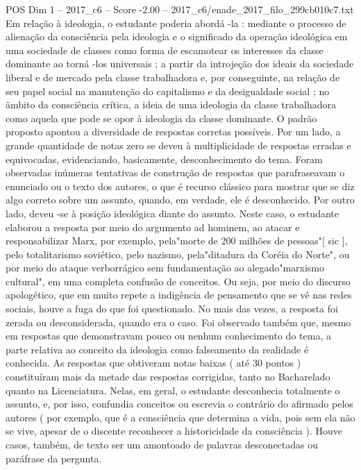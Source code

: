 \begin{textsample}{POS Dim 1 – 2017\_c6 – Score -2.00 – 2017\_c6/enade\_2017\_filo\_299cb010c7.txt}
Em relação à ideologia, o estudante poderia abordá -la : mediante o processo de alienação da consciência pela ideologia e o significado da operação ideológica em uma sociedade de classes como forma de escamotear os interesses da classe dominante ao torná -los universais ; a partir da introjeção dos ideais da sociedade liberal e de mercado pela classe trabalhadora e, por conseguinte, na relação de seu papel social na manutenção do capitalismo e da desigualdade social ; no âmbito da consciência crítica, a ideia de uma ideologia da classe trabalhadora como aquela que pode se opor à ideologia da classe dominante.
O padrão proposto apontou a diversidade de respostas corretas possíveis.
Por um lado, a grande quantidade de notas zero se deveu à multiplicidade de respostas erradas e equivocadas, evidenciando, basicamente, desconhecimento do tema.
Foram observadas inúmeras tentativas de construção de respostas que parafraseavam o enunciado ou o texto dos autores, o que é recurso clássico para mostrar que se diz algo correto sobre um assunto, quando, em verdade, ele é desconhecido.
Por outro lado, deveu -se à posição ideológica diante do assunto.
Neste caso, o estudante elaborou a resposta por meio do argumento ad hominem, ao atacar e responsabilizar Marx, por exemplo, pela"morte de 200 milhões de pessoas"[ sic ], pelo totalitarismo soviético, pelo nazismo, pela"ditadura da Coréia do Norte", ou por meio do ataque verborrágico sem fundamentação ao alegado"marxismo cultural", em uma completa confusão de conceitos.
Ou seja, por meio do discurso apologético, que em muito repete a indigência de pensamento que se vê nas redes sociais, houve a fuga do que foi questionado.
No mais das vezes, a resposta foi zerada ou desconsiderada, quando era o caso.
Foi observado também que, mesmo em respostas que demonstravam pouco ou nenhum conhecimento do tema, a parte relativa ao conceito da ideologia como falseamento da realidade é conhecida.
As respostas que obtiveram notas baixas ( até 30 pontos ) constituíram mais da metade das respostas corrigidas, tanto no Bacharelado quanto na Licenciatura.
Nelas, em geral, o estudante desconhecia totalmente o assunto, e, por isso, confundia conceitos ou escrevia o contrário do afirmado pelos autores ( por exemplo, que é a consciência que determina a vida, pois sem ela não se vive, apesar de o discente reconhecer a historicidade da consciência ).
Houve casos, também, de texto ser um amontoado de palavras desconectadas ou paráfrase da pergunta.

\end{textsample}
